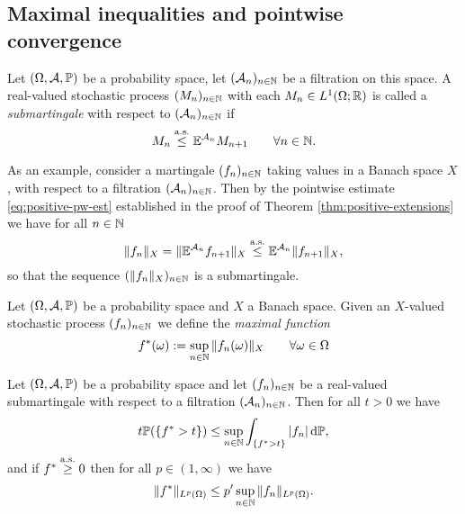 \subsection{Maximal inequalities and pointwise convergence}


\begin{defn}
  Let $(\Omega, \mathcal{A}, \mathbb{P})$ be a probability space, let $(\mathcal{A}_n)_{n \in \mathbb{N}}$ be a filtration on this space.
  A real-valued stochastic process $(M_n)_{n \in \mathbb{N}}$ with each $M_n \in L^1(\Omega; \mathbb{R})$ is called a \emph{submartingale} with respect to $(\mathcal{A}_n)_{n \in \mathbb{N}}$ if 
  \begin{equation}\label{eq:mgale-defining-property}
    M_n \stackrel{\mathrm{a.s.}}{\leq} \mathbb{E}^{\mathcal{A}_n} M_{n+1} \qquad \forall n \in \mathbb{N}.
  \end{equation}
\end{defn}

As an example, consider a martingale $(f_n)_{n \in \mathbb{N}}$ taking values in a Banach space $X$, with respect to a filtration $(\mathcal{A}_{n})_{n \in \mathbb{N}}$.
Then by the pointwise estimate \eqref{eq:positive-pw-est} established in the proof of Theorem \ref{thm:positive-extensions} we have for all $n \in \mathbb{N}$ 
\begin{equation*}
  \|f_n\|_X = \|\mathbb{E}^{\mathcal{A}_n} f_{n+1}\|_X \stackrel{\mathrm{a.s.}}{\leq} \mathbb{E}^{\mathcal{A}_n} \|f_{n+1}\|_X,
\end{equation*}
so that the sequence $(\|f_n\|_X)_{n \in \mathbb{N}}$ is a submartingale.

\begin{defn}
  Let $(\Omega,\mathcal{A},\mathbb{P})$ be a probability space and $X$ a Banach space.
  Given an $X$-valued stochastic process $(f_{n})_{n \in \mathbb{N}}$ we define the \emph{maximal function}
  \begin{equation*}
    f^*(\omega) := \sup_{n \in \mathbb{N}} \|f_{n}(\omega)\|_{X} \qquad \forall \omega \in \Omega
  \end{equation*}
\end{defn}

\begin{thm}\label{thm:doob}
  Let $(\Omega, \mathcal{A}, \mathbb{P})$ be a probability space  and let $(f_{n})_{n \in \mathbb{N}}$ be a real-valued submartingale with respect to a filtration $(\mathcal{A}_{n})_{n \in \mathbb{N}}$.
  Then for all $t > 0$ we have
  \begin{equation*}
    t\mathbb{P}(\{f^* > t\}) \leq   \sup_{n \in \mathbb{N}} \int_{\{f^* > t\}} |f_{n}| \, \mathrm{d}\mathbb{P},
  \end{equation*}
  and if $f^* \stackrel{\mathrm{a.s.}}{\geq} 0$ then for all $p \in (1,\infty)$ we have
  \begin{equation*}
    \|f^*\|_{L^p(\Omega)} \leq p' \sup_{n \in \mathbb{N}} \|f_{n}\|_{L^p(\Omega)}.
  \end{equation*}
\end{thm}

